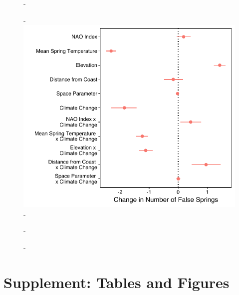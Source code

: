 \documentclass{article}\usepackage[]{graphicx}\usepackage[]{color}
\begin{document}
{\begin{figure} [H]
  -\begin{center}
  -\includegraphics[width=16cm]{..//figures/model_output_berniefive.pdf}
  -\caption{}\label{fig:five}
  -\end{center}
  -\end{figure}}


\section*{Supplement: Tables and Figures}
  
\end{document}
